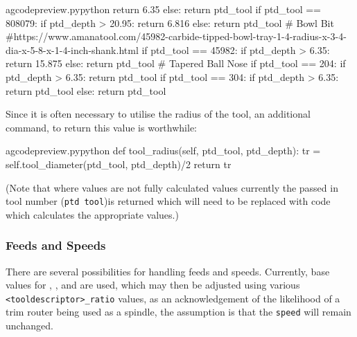 \documentclass{ltxdoc}
\begin{document}
\begin{writecode}{a}{gcodepreview.py}{python}
                return 6.35
            else:
                return ptd_tool
        if ptd_tool == 808079:
            if ptd_depth > 20.95:
                return 6.816
            else:
                return ptd_tool
# Bowl Bit
#https://www.amanatool.com/45982-carbide-tipped-bowl-tray-1-4-radius-x-3-4-dia-x-5-8-x-1-4-inch-shank.html 
        if ptd_tool == 45982:
            if ptd_depth > 6.35:
                return 15.875
            else:
                return ptd_tool
# Tapered Ball Nose
        if ptd_tool == 204:
            if ptd_depth > 6.35:
                return ptd_tool
        if ptd_tool == 304:
            if ptd_depth > 6.35:
                return ptd_tool
            else:
                return ptd_tool

\end{writecode}
\addtocounter{gcpy}{82}

Since it is often necessary to utilise the radius of the tool, an additional command,  to return this value is worthwhile:
 
\lstset{firstnumber=\thegcpy}
\begin{writecode}{a}{gcodepreview.py}{python}
    def tool_radius(self, ptd_tool, ptd_depth):
        tr = self.tool_diameter(ptd_tool, ptd_depth)/2
        return tr

\end{writecode}
\addtocounter{gcpy}{4}
 
\noindent (Note that where values are not fully calculated values currently the passed in tool number (\verb|ptd tool|)is returned which will need to be replaced with code which calculates the appropriate values.)

\subsubsection{Feeds and Speeds}

There are several possibilities for handling feeds and speeds. Currently, base values for , , and  are used, which may then be adjusted using various \verb|<tooldescriptor>_ratio| values, as an acknowledgement of the likelihood of a trim router being used as a spindle, the assumption is that the \texttt{speed} will remain unchanged.

\end{document}
